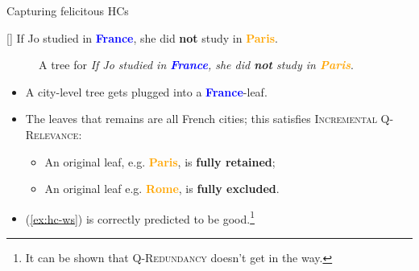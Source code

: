 \documentclass[10pt]{beamer}
\newcommand{\stronger}[1]{\textbf{\textcolor{orange}{#1}}}
\newcommand{\weaker}[1]{\textbf{\textcolor{blue}{#1}}}
\newcommand{\Paris}{\textbf{\textcolor{orange}{Paris}}}
\newcommand{\France}{\textbf{\textcolor{blue}{France}}}
\let\oldcaption=\caption
\renewcommand{\caption}[1][]{\oldcaption{\centering #1}}
\begin{document}
\begin{frame}{Capturing felicitous HCs}
	\begin{exe}
		[] {If Jo studied in \France, she did \textbf{not} study in \Paris.}
	\end{exe}
	\begin{minipage}{.4\linewidth}
		\centering
		\begin{figure}[H]
			\centering
			\begin{minipage}{\linewidth}
				\centering
				\scalebox{.8}{
					\begin{forest}
						[CS[\xcancel{\faFlagCheckered}\\\France][\weaker{Italy}][\weaker{...}]]
				\end{forest}}
			\end{minipage}
			\begin{minipage}{\linewidth}
				\centering
				\scalebox{.8}{
					\begin{forest}
						[{CS$\cap$\France}[{\stronger{Paris}}][{\faFlagCheckered\\\stronger{Lyon}}][{\faFlagCheckered\\\stronger{...}}]]
						\draw[->] (0, .5) to[out=north, in=south] (-1, 1.2);
				\end{forest}}
			\end{minipage}\vspace{-3mm}
			\caption{A tree for \textit{If Jo studied in \France, she did \textbf{not} study in \Paris}.}
		\end{figure}
	\end{minipage}\hfill
	\begin{minipage}{.55\linewidth}
		\begin{itemize}
			\item A city-level tree gets plugged into a \France-leaf.\pause
			\item The leaves that remains are all French cities; this satisfies \textsc{Incremental Q-Relevance}:\pause
			\begin{itemize}
				\item An original leaf, e.g. \Paris, is \textbf{fully retained};\pause
				\item An original leaf e.g. \stronger{Rome}, is \textbf{fully excluded}.\pause
			\end{itemize}
			\item (\ref{ex:hc-ws}) is correctly predicted to be good.\footnote{It can be shown that \textsc{Q-Redundancy} doesn't get in the way.}
		\end{itemize}
	\end{minipage}
\end{frame}
\end{document}

